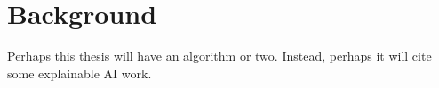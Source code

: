 \chapter{Background}

Perhaps this thesis will have an algorithm or two\cite{knuth-fa}. Instead,
perhaps it will cite some explainable AI work\cite{whitten2024naecon}.

\lipsum[1-7]